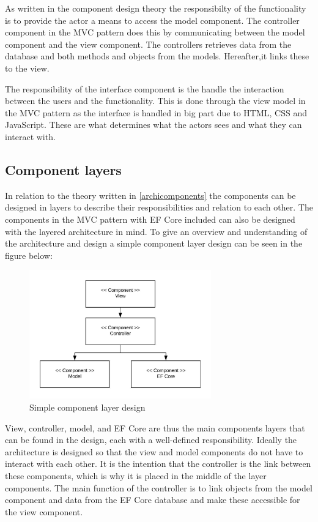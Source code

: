 As written in the component design theory the responsibilty of the functionality is to provide the actor a means to access the model component.
The controller component in the MVC pattern does this by communicating between the model component and the view component.
The controllers retrieves data from the database and both methods and objects from the models.
Hereafter,it links these to the view.

The responsibility of the interface component is the handle the interaction between the users and the functionality.
This is done through the view model in the MVC pattern as the interface is handled in big part due to HTML, CSS and JavaScript.
These are what determines what the actors sees and what they can interact with.

\subsection{Component layers}
In relation to the theory written in \cref{archicomponents} the components can be designed in layers to describe their responsibilities and relation to each other.
The components in the MVC pattern with EF Core included can also be designed with the layered architecture in mind.
To give an overview and understanding of the architecture and design a simple component layer design can be seen in the figure below:

\begin{figure}[H]
	\centering
	\includegraphics[width=0.7\textwidth]{billeder/simplecomponents.jpeg}
	\caption{Simple component layer design}\label{fig:SimpleComponent}
\end{figure}

View, controller, model, and EF Core are thus the main components layers that can be found in the design, each with a well-defined responsibility.
Ideally the architecture is designed so that the view and model components do not have to interact with each other.
It is the intention that the controller is the link between these components, which is why it is placed in the middle of the layer components.
The main function of the controller is to link objects from the model component and data from the EF Core database and make these accessible for the view component.

